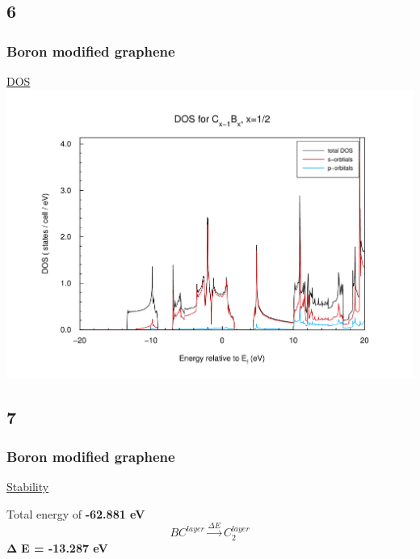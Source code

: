 \documentclass{beamer}
\begin{document}
	\subsection*{6}
		\begin{frame}
			\frametitle{Boron modified graphene}
			\underline{DOS}
			\includegraphics[width=\textwidth]{figures/Bor1R/dos.pdf}
		\end{frame}

	\subsection*{7}
		\begin{frame}
			\frametitle{Boron modified graphene}
			\underline{Stability}
			\begin{center}
				Total energy of \textbf{-62.881 eV} \\
				\begin{equation}
					BC^{layer} \xrightarrow{\Delta E} C_2^{layer}
				\end{equation}
				$\boldsymbol{\Delta}$ \textbf{E = -13.287 eV}
			\end{center}
		\end{frame}
		
\end{document}
